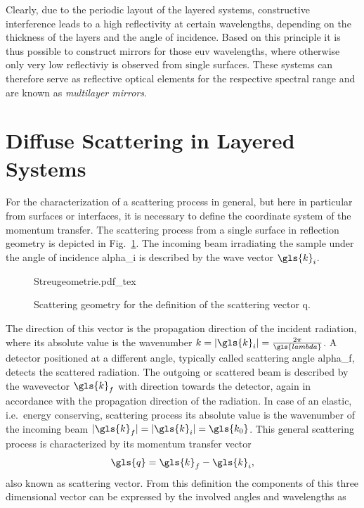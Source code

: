 Clearly, due to the periodic layout of the layered systems, constructive interference leads to a high reflectivity at certain wavelengths, depending on the thickness of the layers and the angle of incidence. Based on this principle it is thus possible to construct mirrors for those \gls{euv} wavelengths, where otherwise only very low reflectiviy is observed from single surfaces. These systems can therefore serve as reflective optical elements for the respective spectral range and are known as \emph{multilayer mirrors}.


\section{Diffuse Scattering in Layered Systems} \label{ch_theo:sec_diffuse_scattering}
For the characterization of a scattering process in general, but here in particular from surfaces or interfaces, it is necessary to define the coordinate system of the momentum transfer. The scattering process from a single surface in reflection geometry is depicted in Fig.~\ref{ch_theo:fig_scattering_process}. The incoming beam irradiating the sample under the angle of incidence \gls{alpha_i} is described by the wave vector $\gls{k}_i$.
\begin{figure}[htb]
    {Streugeometrie.pdf_tex}
    \caption[Scattering geometry and definition of the scattering vector.]{Scattering geometry for the definition of the scattering vector \gls{q}.}
    \label{ch_theo:fig_scattering_process}
\end{figure}
The direction of this vector is the propagation direction of the incident radiation, where its absolute value is the wavenumber $k = |\gls{k}_i| = \frac{2 \pi}{\gls{lambda}}$. A detector positioned at a different angle, typically called scattering angle \gls{alpha_f}, detects the scattered radiation. The outgoing or scattered beam is described by the wavevector $\gls{k}_f$ with direction towards the detector, again in accordance with the propagation direction of the radiation. In case of an elastic, i.e.~energy conserving, scattering process its absolute value is the wavenumber of the incoming beam $|\gls{k}_f| = |\gls{k}_i| = \gls{k_0}$. This general scattering process is characterized by its momentum transfer vector 
\begin{align}
\gls{q} = \gls{k}_f - \gls{k}_i\text{,} \label{ch:theo_eqn:q}
\end{align}
also known as scattering vector. From this definition the components of this three dimensional vector can be expressed by the involved angles and wavelengths as
